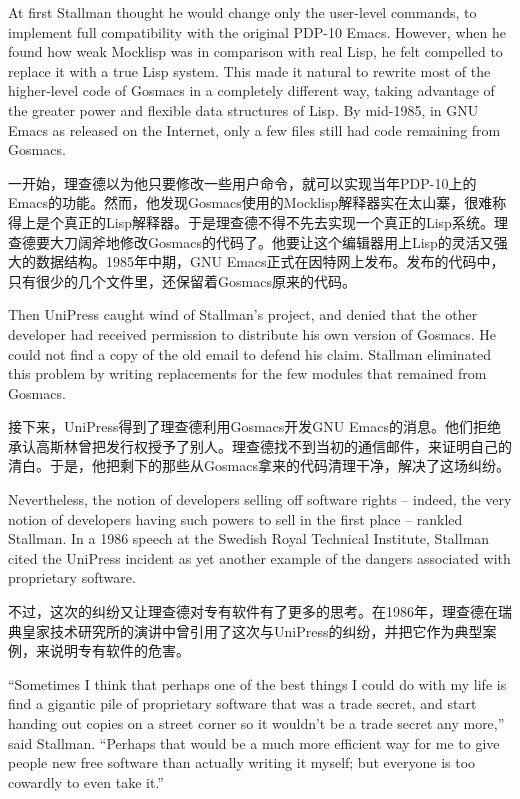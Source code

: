 \ifdefined\eng
At first Stallman thought he would change only the user-level commands, to implement full compatibility with the original PDP-10 Emacs.  However, when he found how weak Mocklisp was in comparison with real Lisp, he felt compelled to replace it with a true Lisp system.  This made it natural to rewrite most of the higher-level code of Gosmacs in a completely different way, taking advantage of the greater power and flexible data structures of Lisp.  By mid-1985, in GNU Emacs as released on the Internet, only a few files still had code remaining from Gosmacs.
\fi

\ifdefined\chs
一开始，理查德以为他只要修改一些用户命令，就可以实现当年PDP-10上的Emacs的功能。然而，他发现Gosmacs使用的Mocklisp解释器实在太山寨，很难称得上是个真正的Lisp解释器。于是理查德不得不先去实现一个真正的Lisp系统。理查德要大刀阔斧地修改Gosmacs的代码了。他要让这个编辑器用上Lisp的灵活又强大的数据结构。1985年中期，GNU Emacs正式在因特网上发布。发布的代码中，只有很少的几个文件里，还保留着Gosmacs原来的代码。
\fi

\ifdefined\eng
Then UniPress caught wind of Stallman's project, and denied that the other developer had received permission to distribute his own version of Gosmacs.  He could not find a copy of the old email to defend his claim.  Stallman eliminated this problem by writing replacements for the few modules that remained from Gosmacs.
\fi

\ifdefined\chs
接下来，UniPress得到了理查德利用Gosmacs开发GNU Emacs的消息。他们拒绝承认高斯林曾把发行权授予了别人。理查德找不到当初的通信邮件，来证明自己的清白。于是，他把剩下的那些从Gosmacs拿来的代码清理干净，解决了这场纠纷。
\fi

\ifdefined\eng
Nevertheless, the notion of developers selling off software rights -- indeed, the very notion of developers having such powers to sell in the first place -- rankled Stallman. In a 1986 speech at the Swedish Royal Technical Institute, Stallman cited the UniPress incident as yet another example of the dangers associated with proprietary software.
\fi

\ifdefined\chs
不过，这次的纠纷又让理查德对专有软件有了更多的思考。在1986年，理查德在瑞典皇家技术研究所的演讲中曾引用了这次与UniPress的纠纷，并把它作为典型案例，来说明专有软件的危害。
\fi

\ifdefined\eng
``Sometimes I think that perhaps one of the best things I could do with my life is find a gigantic pile of proprietary software that was a trade secret, and start handing out copies on a street corner so it wouldn't be a trade secret any more,'' said Stallman. ``Perhaps that would be a much more efficient way for me to give people new free software than actually writing it myself; but everyone is too cowardly to even take it.''
\fi


